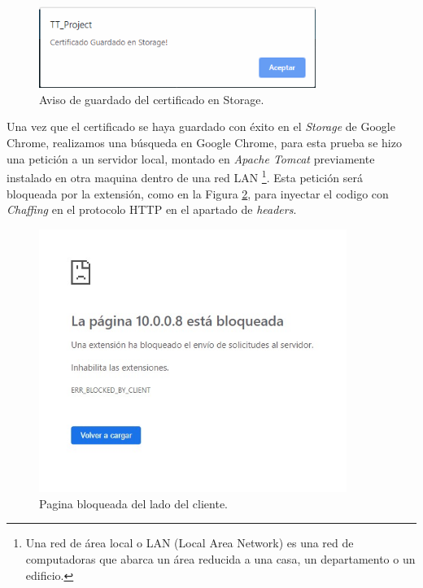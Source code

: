 \documentclass[12pt, a4paper, titlepage]{report}
\begin{document}
        	\begin{figure}[H]
        		\begin{center}	\includegraphics[width=9cm]{./imagenes/Desarrollo/Componente_1/Version1/certificadoStorage.PNG}
        			\caption{Aviso de guardado del certificado en Storage.}
                    \label{fig:certGuardadoStorage}
        		\end{center}
        	\end{figure}
	
        	Una vez que el certificado se haya guardado con éxito en el \textit{Storage} de Google Chrome, realizamos una búsqueda en Google Chrome, para esta prueba se hizo una petición a un servidor local, montado en \textit{Apache Tomcat} previamente instalado en otra maquina dentro de una red LAN \footnote{Una red de área local o LAN (Local Area Network) es una red de computadoras que abarca un área reducida a una casa, un departamento o un edificio.}. Esta petición será bloqueada por la extensión, como en la Figura \ref{fig:paginaBloqueada}, para inyectar el codigo con \textit{Chaffing} en el protocolo HTTP en el apartado de \textit{headers}.
	
            \begin{figure}[H]
        		\begin{center}	\includegraphics[width=10cm]{./imagenes/Desarrollo/Componente_1/Version1/pageBlocked.jpeg}
        			\caption{Pagina bloqueada del lado del cliente.}
        		    \label{fig:paginaBloqueada}
        		\end{center}
        	\end{figure}
    
\end{document}
